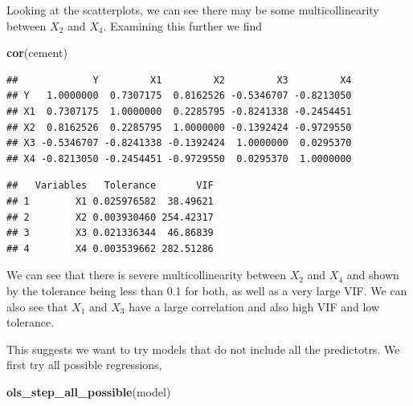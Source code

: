 \documentclass[
  11pt,
]{article}
\newenvironment{Shaded}{\begin{snugshade}}{\end{snugshade}}
\newcommand{\AttributeTok}[1]{\textcolor[rgb]{0.13,0.29,0.53}{#1}}
\newcommand{\FunctionTok}[1]{\textcolor[rgb]{0.13,0.29,0.53}{\textbf{#1}}}
\newcommand{\NormalTok}[1]{#1}
\newcommand{\OtherTok}[1]{\textcolor[rgb]{0.56,0.35,0.01}{#1}}
\newcommand{\SpecialCharTok}[1]{\textcolor[rgb]{0.81,0.36,0.00}{\textbf{#1}}}
\begin{document}
Looking at the scatterplots, we can see there may be some
multicollinearity between \(X_2\) and \(X_4\). Examining this further we
find

\begin{Shaded}
\begin{Highlighting}[]
\FunctionTok{cor}\NormalTok{(cement)}
\end{Highlighting}
\end{Shaded}

\begin{verbatim}
##             Y         X1         X2         X3         X4
## Y   1.0000000  0.7307175  0.8162526 -0.5346707 -0.8213050
## X1  0.7307175  1.0000000  0.2285795 -0.8241338 -0.2454451
## X2  0.8162526  0.2285795  1.0000000 -0.1392424 -0.9729550
## X3 -0.5346707 -0.8241338 -0.1392424  1.0000000  0.0295370
## X4 -0.8213050 -0.2454451 -0.9729550  0.0295370  1.0000000
\end{verbatim}

\begin{Shaded}
\end{Shaded}

\begin{verbatim}
##   Variables   Tolerance       VIF
## 1        X1 0.025976582  38.49621
## 2        X2 0.003930460 254.42317
## 3        X3 0.021336344  46.86839
## 4        X4 0.003539662 282.51286
\end{verbatim}

We can see that there is severe multicollinearity between \(X_2\) and
\(X_4\) and shown by the tolerance being less than 0.1 for both, as well
as a very large VIF. We can also see that \(X_1\) and \(X_3\) have a
large correlation and also high VIF and low tolerance.

This suggests we want to try models that do not include all the
predictotrs. We first try all possible regressions,

\begin{Shaded}
\begin{Highlighting}[]
\FunctionTok{ols\_step\_all\_possible}\NormalTok{(model)}
\end{Highlighting}
\end{Shaded}
\end{document}
